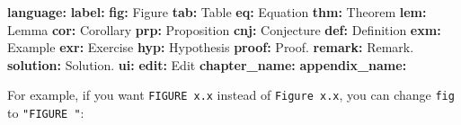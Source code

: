 \documentclass[
  12pt,
]{krantz}
\newenvironment{Shaded}{\begin{snugshade}}{\end{snugshade}}
\newcommand{\AttributeTok}[1]{\textcolor[rgb]{0.13,0.29,0.53}{#1}}
\newcommand{\FunctionTok}[1]{\textcolor[rgb]{0.13,0.29,0.53}{\textbf{#1}}}
\newcommand{\KeywordTok}[1]{\textcolor[rgb]{0.13,0.29,0.53}{\textbf{#1}}}
\newcommand{\StringTok}[1]{\textcolor[rgb]{0.31,0.60,0.02}{#1}}
\begin{document}
\begin{Shaded}
\begin{Highlighting}[]
\FunctionTok{language}\KeywordTok{:}
\AttributeTok{  }\FunctionTok{label}\KeywordTok{:}
\AttributeTok{    }\FunctionTok{fig}\KeywordTok{:}\AttributeTok{ }\StringTok{\textquotesingle{}Figure \textquotesingle{}}
\AttributeTok{    }\FunctionTok{tab}\KeywordTok{:}\AttributeTok{ }\StringTok{\textquotesingle{}Table \textquotesingle{}}
\AttributeTok{    }\FunctionTok{eq}\KeywordTok{:}\AttributeTok{ }\StringTok{\textquotesingle{}Equation \textquotesingle{}}
\AttributeTok{    }\FunctionTok{thm}\KeywordTok{:}\AttributeTok{ }\StringTok{\textquotesingle{}Theorem \textquotesingle{}}
\AttributeTok{    }\FunctionTok{lem}\KeywordTok{:}\AttributeTok{ }\StringTok{\textquotesingle{}Lemma \textquotesingle{}}
\AttributeTok{    }\FunctionTok{cor}\KeywordTok{:}\AttributeTok{ }\StringTok{\textquotesingle{}Corollary \textquotesingle{}}
\AttributeTok{    }\FunctionTok{prp}\KeywordTok{:}\AttributeTok{ }\StringTok{\textquotesingle{}Proposition \textquotesingle{}}
\AttributeTok{    }\FunctionTok{cnj}\KeywordTok{:}\AttributeTok{ }\StringTok{\textquotesingle{}Conjecture \textquotesingle{}}
\AttributeTok{    }\FunctionTok{def}\KeywordTok{:}\AttributeTok{ }\StringTok{\textquotesingle{}Definition \textquotesingle{}}
\AttributeTok{    }\FunctionTok{exm}\KeywordTok{:}\AttributeTok{ }\StringTok{\textquotesingle{}Example \textquotesingle{}}
\AttributeTok{    }\FunctionTok{exr}\KeywordTok{:}\AttributeTok{ }\StringTok{\textquotesingle{}Exercise \textquotesingle{}}
\AttributeTok{    }\FunctionTok{hyp}\KeywordTok{:}\AttributeTok{ }\StringTok{\textquotesingle{}Hypothesis \textquotesingle{}}
\AttributeTok{    }\FunctionTok{proof}\KeywordTok{:}\AttributeTok{ }\StringTok{\textquotesingle{}Proof. \textquotesingle{}}
\AttributeTok{    }\FunctionTok{remark}\KeywordTok{:}\AttributeTok{ }\StringTok{\textquotesingle{}Remark. \textquotesingle{}}
\AttributeTok{    }\FunctionTok{solution}\KeywordTok{:}\AttributeTok{ }\StringTok{\textquotesingle{}Solution. \textquotesingle{}}
\AttributeTok{  }\FunctionTok{ui}\KeywordTok{:}
\AttributeTok{    }\FunctionTok{edit}\KeywordTok{:}\AttributeTok{ Edit}
\AttributeTok{    }\FunctionTok{chapter\_name}\KeywordTok{:}\AttributeTok{ }\StringTok{\textquotesingle{}\textquotesingle{}}
\AttributeTok{    }\FunctionTok{appendix\_name}\KeywordTok{:}\AttributeTok{ }\StringTok{\textquotesingle{}\textquotesingle{}}
\end{Highlighting}
\end{Shaded}

For example, if you want \texttt{FIGURE\ x.x} instead of \texttt{Figure\ x.x}, you can change \texttt{fig} to \texttt{"FIGURE\ "}:
\end{document}

